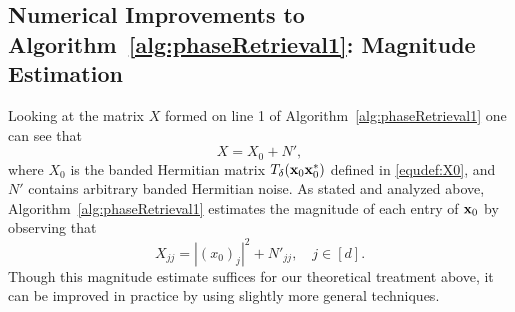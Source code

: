 \subsection{Numerical Improvements to Algorithm~\ref{alg:phaseRetrieval1}:  Magnitude Estimation}
\label{sec:MagEstImpNumerical}

Looking at the matrix $X$ formed on line 1 of Algorithm~\ref{alg:phaseRetrieval1} one can see that $$X= X_0 + N',$$ where $X_0$ is the banded Hermitian matrix $T_\delta(\mathbf x_0 \mathbf x_0^*)$ defined in \eqref{equdef:X0}, and $N'$ contains arbitrary banded Hermitian noise.  As stated and analyzed above, Algorithm~\ref{alg:phaseRetrieval1} estimates the magnitude of each entry of $\mathbf x_0$ by observing that $$X_{jj} = |(x_0)_{j}|^2 + N'_{jj}, \quad j \in [d].$$ Though this magnitude estimate suffices for our theoretical treatment above, it can be improved in practice by using slightly more general techniques.

